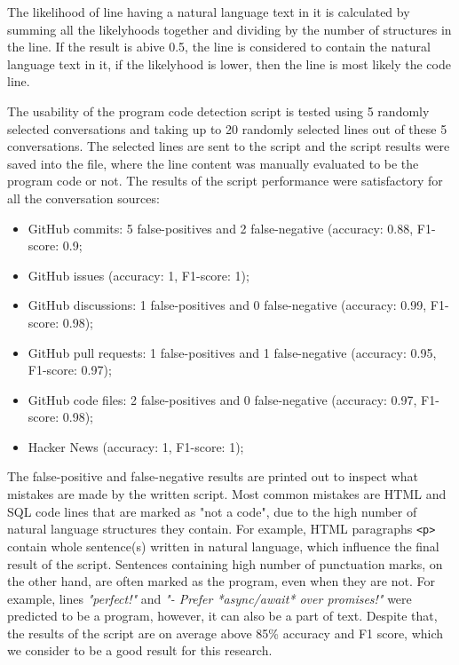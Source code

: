 The likelihood of line having a natural language text in it is calculated by summing all the likelyhoods together and dividing by the number of structures in the line. If the result is abive 0.5, the line is considered to contain the natural language text in it, if the likelyhood is lower, then the line is most likely the code line. 

The usability of the program code detection script is tested using 5 randomly selected conversations and taking up to 20 randomly selected lines out of these 5 conversations. The selected lines are sent to the script and the script results were saved into the file, where the line content was manually evaluated to be the program code or not. The results of the script performance were satisfactory for all the conversation sources:
\begin{itemize}
    \item GitHub commits: 5 false-positives and 2 false-negative (accuracy: 0.88, F1-score: 0.9;
    \item GitHub issues (accuracy: 1, F1-score: 1);
    \item GitHub discussions: 1 false-positives and 0 false-negative (accuracy: 0.99, F1-score: 0.98); 
    \item GitHub pull requests: 1 false-positives and 1 false-negative (accuracy: 0.95, F1-score: 0.97); 
    \item GitHub code files: 2 false-positives and 0 false-negative (accuracy: 0.97, F1-score: 0.98);
    \item Hacker News (accuracy: 1, F1-score: 1);
\end{itemize}

The false-positive and false-negative results are printed out to inspect what mistakes are made by the written script. Most common mistakes are HTML and SQL code lines that are marked as "not a code", due to the high number of natural language structures they contain. For example, HTML paragraphs \texttt{<p>} contain whole sentence(s) written in natural language, which influence the final result of the script. Sentences containing high number of punctuation marks, on the other hand, are often marked as the program, even when they are not. For example, lines \textit{"perfect!"} and \textit{"- Prefer *async/await* over promises!"} were predicted to be a program, however, it can also be a part of text. Despite that, the results of the script are on average above 85\% accuracy and F1 score, which we consider to be a good result for this research. 

